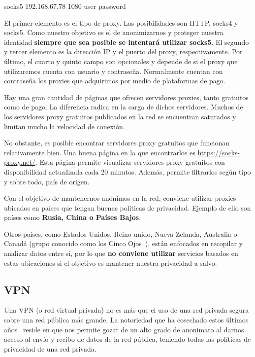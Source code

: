 {\selectfont 
	socks5  192.168.67.78   1080    user   password
}

El primer elemento es el tipo de proxy. Las posibilidades son HTTP, socks4 y socks5. Como nuestro objetivo es el de anonimizarnos y proteger nuestra identidad \textbf{siempre que sea posible se intentará utilizar socks5}.
El segundo y tercer elemento es la dirección IP y el puerto del proxy, respectivamente. 
Por último, el cuarto y quinto campo son opcionales y depende de si el proxy que utilizaremos cuenta con usuario y contraseña. Normalmente cuentan con contraseña los proxies que adquirimos por medio de plataformas de pago.

Hay una gran cantidad de páginas que ofrecen servidores proxies, tanto gratuitos como de pago. La diferencia radica en la carga de dichos servidores. Muchos de los servidores proxy gratuitos publicados en la red se encuentran saturados y limitan mucho la velocidad de conexión.

No obstante, es posible encontrar servidores proxy gratuitos que funcionan relativamente bien. Una buena página en la que encontrarlos es \url{https://socks-proxy.net/}. 
Esta página permite visualizar servidores proxy gratuitos con disponibilidad actualizada cada 20 minutos. Además, permite filtrarlos según tipo y sobre todo, país de origen.

Con el objetivo de mantenernos anónimos en la red, conviene utilizar proxies ubicados en países que tengan buenas políticas de privacidad. Ejemplo de ello son países como \textbf{Rusia, China o Países Bajos}. 

Otros países, como Estados Unidos, Reino unido, Nueva Zelanda, Australia o Canadá \label{key}(grupo conocido como los Cinco Ojos~\cite{article:politicas}), están enfocados en recopilar y analizar datos entre sí, por lo que \textbf{no conviene utilizar} servicios basados en estas ubicaciones si el objetivo es mantener nuestra privacidad a salvo.  

\subsection{VPN}

Una VPN (o red virtual privada) no es más que el uso de una red privada segura sobre una red pública más grande. 
La notoriedad que ha cosechado estos últimos años~\cite{article:notoriedad} reside en que nos permite gozar de un alto grado de anonimato al darnos acceso al envío y recibo de datos de la red pública, teniendo todas las políticas de privacidad de una red privada.

